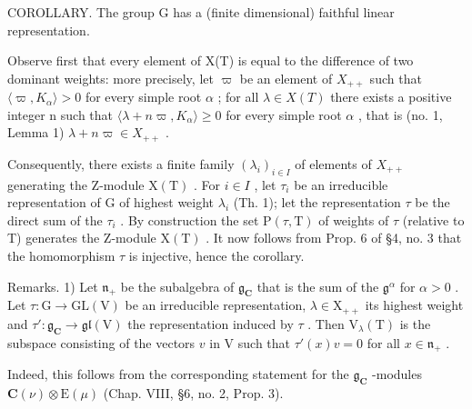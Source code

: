 COROLLARY. The group G has a (finite dimensional) faithful linear representation.

Observe first that every element of X(T) is equal to the difference of two dominant weights: more precisely, let \(\varpi\) be an element of \(X_{++}\) such that \(\langle\varpi,K_{\alpha}\rangle>0\) for every simple root \(\alpha\) ; for all \(\lambda\in X(T)\) there exists a positive integer n such that \(\langle\lambda+n\varpi,K_{\alpha}\rangle\geq0\) for every simple root \(\alpha\) , that is (no. 1, Lemma 1) \(\lambda+n\varpi\in X_{++}\) .

Consequently, there exists a finite family \((\lambda_{i})_{i\in I}\) of elements of \(X_{++}\) generating the Z-module \(\mathrm{X(T)}\) . For \(i\in I\) , let \(\tau_{i}\) be an irreducible representation of G of highest weight \(\lambda_{i}\) (Th. 1); let the representation \(\tau\) be the direct sum of the \(\tau_{i}\) . By construction the set \(\mathrm{P}(\tau,\mathrm{T})\) of weights of \(\tau\) (relative to T) generates the Z-module \(\mathrm{X(T)}\) . It now follows from Prop. 6 of §4, no. 3 that the homomorphism \(\tau\) is injective, hence the corollary.

Remarks. 1) Let \(\mathfrak{n}_{+}\) be the subalgebra of \(\mathfrak{g}_{\mathbf{C}}\) that is the sum of the \(\mathfrak{g}^{\alpha}\) for \(\alpha > 0\) . Let \(\tau: \mathrm{G} \to \mathrm{GL}(\mathrm{V})\) be an irreducible representation, \(\lambda \in \mathrm{X}_{++}\) its highest weight and \(\tau': \mathfrak{g}_{\mathbf{C}} \to \mathfrak{gl}(\mathrm{V})\) the representation induced by \(\tau\) . Then \(\mathrm{V}_{\lambda}(\mathrm{T})\) is the subspace consisting of the vectors \(v\) in \(\mathrm{V}\) such that \(\tau'(x)v = 0\) for all \(x \in \mathfrak{n}_{+}\) .

Indeed, this follows from the corresponding statement for the \(\mathfrak{g}_{\mathbf{C}}\) -modules \(\mathbf{C}(\nu) \otimes \mathrm{E}(\mu)\) (Chap. VIII, §6, no. 2, Prop. 3).

